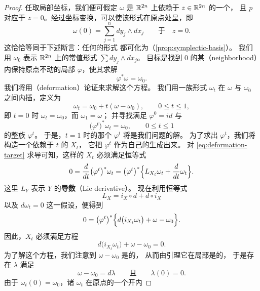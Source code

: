 \begin{proof}
任取局部坐标，我们便可假定 $\omega$ 是 $\mathbb{R}^{2n}$ 上依赖于 $z\in\mathbb{R}^{2n}$ 的一个\trTwoForm，%
且 $p$ 对应于 $z=0$。经过\trLinear{}坐标变换，可以使该形式在原点处呈\trNormalForm，即
\[
\omega(0)=\sum_{j=1}^{n}dy_j\wedge dx_j\qquad\text{于}\quad z=0.
\]
这恰恰等同于下述断言：任何\trNondegenerate{}的\trAntisymmetric\trBilinear{}形式%
都可化为\trNormalForm{}（\cref{prop:symplectic-basis}）。%
我们用 $\omega_0$ 表示 $\mathbb{R}^{2n}$ 上的常值形式 $\sum dy_j\wedge dx_j$。%
目标是找到 $0$ 的某\textbf{\trNeighborhood}（neighborhood）内保持原点不动的局部\trDiffeomorphism{} $\varphi$，使其求解
\[
\varphi^{*}\omega=\omega_0.
\]
我们将用\textbf{\trDeformation}（deformation）论证来求解这个方程。%
我们用一族形式 $\omega_t$ 在 $\omega$ 与 $\omega_0$ 之间内插，定义为
\[
\omega_t=\omega_0+t(\omega-\omega_0),\qquad 0\le t\le1,
\]
即 $t=0$ 时 $\omega_t=\omega_0$，而 $\omega_1=\omega$；%
并寻找满足 $\varphi^{0}=id$ 与
\begin{equation}\label{eq:deformation-target}
\bigl(\varphi^{t}\bigr)^{*}\omega_t=\omega_0,\qquad 0\le t\le1
\end{equation}
的整族\trDiffeomorphism{} $\varphi^{t}$。%
于是，$t=1$ 时的那个\trDiffeomorphism{} $\varphi^{t}$ 将是我们问题的解。%
为了求出 $\varphi^{t}$，我们将构造一个依赖于 $t$ 的\trVectorField{} $X_t$，%
它把 $\varphi^{t}$ 作为自己的\trFlow{}生成出来。%
对 \eqref{eq:deformation-target} 求导可知，这样的\trVectorField{} $X_t$ 必须满足恒等式
\begin{equation}\label{eq:lie-identity-omegat}
0=\frac{d}{dt}\bigl(\varphi^{t}\bigr)^{*}\omega_t
 =\bigl(\varphi^{t}\bigr)^{*}\Bigl\{L_{X_t}\omega_t+\frac{d}{dt}\omega_t\Bigr\}.
\end{equation}
这里 $L_Y$ 表示\trVectorField{} $Y$ 的\textbf{\trLie{}导数}（Lie derivative）。%
现在利用\trCartan{}恒等式
\begin{equation}\label{eq:cartan-identity}
L_X=i_X\circ d+d\circ i_X
\end{equation}
以及 $d\omega_t=0$ 这一假设，便得到
\[
0=\bigl(\varphi^{t}\bigr)^{*}\Bigl\{d\bigl(i_{X_t}\omega_t\bigr)+\omega-\omega_0\Bigr\}.
\]
因此，$X_t$ 必须满足\trLinear{}方程
\begin{equation}\label{eq:xt-linear}
d\bigl(i_{X_t}\omega_t\bigr)+\omega-\omega_0=0.
\end{equation}
为了解这个方程，我们注意到 $\omega-\omega_0$ 是\trClosed{}的，%
从而由\trPoincare{}引理它在局部是\trExact{}的，%
于是存在\trOneForm{} $\lambda$ 满足
\[
\omega-\omega_0=d\lambda\qquad\text{且}\qquad\lambda(0)=0.
\]
由于 $\omega_t(0)=\omega_0$，诸\trTwoForm{} $\omega_t$ 在原点的一个开\trNeighborhood{}内%

\end{proof}
